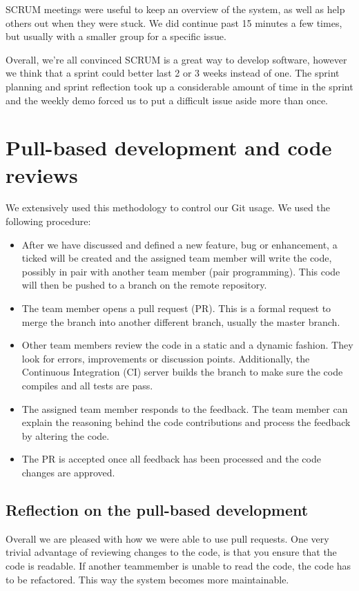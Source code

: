 SCRUM meetings were useful to keep an overview of the system, as well as help others out when they were stuck.
We did continue past 15 minutes a few times, but usually with a smaller group for a specific issue.

Overall, we're all convinced SCRUM is a great way to develop software, however we think that a sprint could better last 2 or 3 weeks instead of one.
The sprint planning and sprint reflection took up a considerable amount of time in the sprint and the weekly demo forced us to put a difficult issue aside more than once.

\section{Pull-based development and code reviews}
We extensively used this methodology to control our Git usage.
We used the following procedure:

\begin{itemize}
\item After we have discussed and defined a new feature, bug or enhancement, a ticked will be created and the assigned team member will write the code, possibly in pair with another team member (pair programming).
This code will then be pushed to a branch on the remote repository.

\item The team member opens a pull request (PR). 
This is a formal request to merge the branch into another different branch, usually the master branch.

\item Other team members review the code in a static and a dynamic fashion.
They look for errors, improvements or discussion points. 
Additionally, the Continuous Integration (CI) server builds the branch to make sure the code compiles and all tests are pass.

\item The assigned team member responds to the feedback.
The team member can explain the reasoning behind the code contributions and process the feedback by altering the code.

\item The PR is accepted once all feedback has been processed and the code changes are approved.
\end{itemize}

\subsection{Reflection on the pull-based development}
Overall we are pleased with how we were able to use pull requests.
One very trivial advantage of reviewing changes to the code, is that you ensure that the code is readable.
If another teammember is unable to read the code, the code has to be refactored.
This way the system becomes more maintainable.

